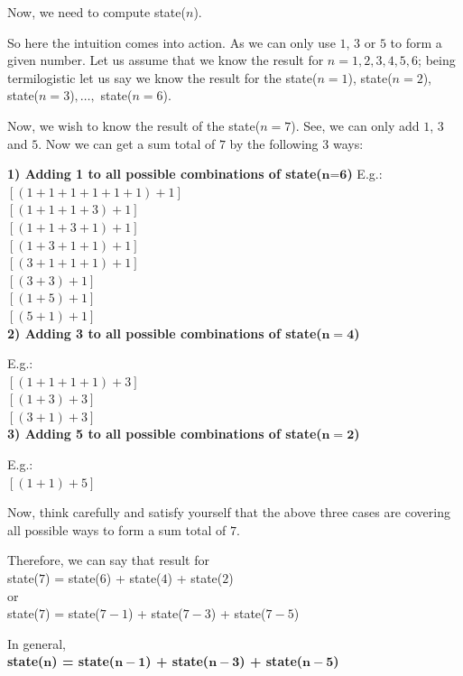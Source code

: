 Now, we need to compute state($n$).


So here the intuition comes into action. As we can only use $1$, $3$ or $5$
to form a given number. Let us assume that we know the result for
$n=1,2,3,4,5,6$; being termilogistic let us say we know the result for the
state($n=1$), state($n=2$), state($n=3$)$, \ldots, $ state($n=6$).

Now, we wish to know the result of the state($n=7$). See, we can only add
$1$, $3$ and $5$. Now we can get a sum total of $7$ by the following 3 ways:

\textbf{1) Adding 1 to all possible combinations of state($\textbf{n=6}$)}
E.g.:\\
$[ (1+1+1+1+1+1) + 1]$\\
$[ (1+1+1+3) + 1]$\\
$[ (1+1+3+1) + 1]$\\
$[ (1+3+1+1) + 1]$\\
$[ (3+1+1+1) + 1]$\\
$[ (3+3) + 1]$\\
$[ (1+5) + 1]$\\
$[ (5+1) + 1]$\\

\textbf{2) Adding 3 to all possible combinations of state($\bm{n=4}$)}

E.g.:\\
$[(1+1+1+1) + 3]$\\
$[(1+3) + 3]$\\
$[(3+1) + 3]$\\

\textbf{3) Adding 5 to all possible combinations of state($\bm{n=2}$)}

E.g.:\\
$[ (1+1) + 5]$

Now, think carefully and satisfy yourself that the above three cases are
covering all possible ways to form a sum total of $7$. 

Therefore, we can say that result for\\
state($7$) = state($6$) + state($4$) + state($2$)\\
or\\
state($7$) = state($7-1$) + state($7-3$) + state($7-5$)

In general,\\
\textbf{state($\bm{n}$) = state($\bm{n-1}$) + state($\bm{n-3}$) +
  state($\bm{n-5}$)}\\

